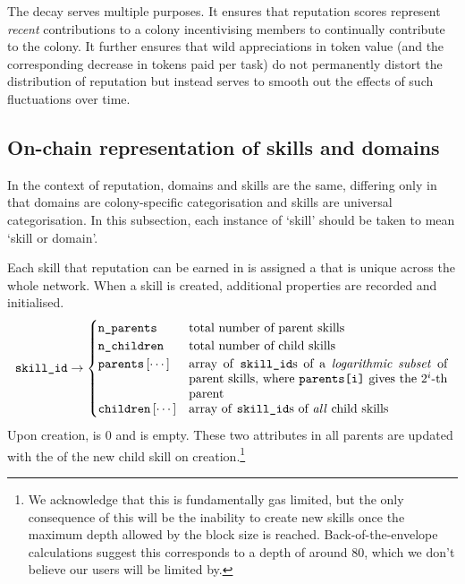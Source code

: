 The decay serves multiple purposes. It ensures that reputation scores represent \emph{recent} contributions to a colony incentivising members to continually contribute to the colony. It further ensures that wild appreciations in token value (and the corresponding decrease in tokens paid per task) do not permanently distort the distribution of reputation but instead serves to smooth out the effects of such fluctuations over time.

\subsection{On-chain representation of skills and domains}\label{subsec:on-chain-representation-of-skills}
In the context of reputation, domains and skills are the same, differing only in that domains are colony-specific categorisation and skills are universal categorisation. In this subsection, each instance of `skill' should be taken to mean `skill or domain'.

Each skill that reputation can be earned in is assigned a  that is unique across the whole network. When a skill is created, additional properties are recorded and initialised.
\begin{equation*}
  \ascode{skill\_id} \rightarrow
  \begin{cases}
    \ascode{n\_parents} &	\textnormal{total number of parent skills}\\
    \ascode{n\_children} &	\textnormal{total number of child skills}\\
    \ascode{parents}\left[\cdots\right] &	\parbox[t]{.6\linewidth}{\textnormal{array of \ascode{skill\_id}s of a \textit{logarithmic subset} of parent skills, where \ascode{parents[i]} gives the $2^i$-th parent}}\\
    \ascode{children}\left[\cdots\right] &	\textnormal{array of \ascode{skill\_id}s of \textit{all} child skills}
  \end{cases}
\end{equation*}
Upon creation,  is 0 and  is empty\watermark. These two attributes in all parents are updated with the  of the new child skill on creation.\footnote{We acknowledge that this is fundamentally gas limited, but the only consequence of this will be the inability to create new skills once the maximum depth allowed by the block size is reached. Back-of-the-envelope calculations suggest this corresponds to a depth of around 80, which we don't believe our users will be limited by.}

